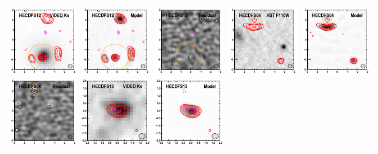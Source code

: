 \documentclass[iop]{emulateapj}
\begin{document}
\begin{figure}[!tbp] 
    \begin{centering}
\includegraphics[width=0.162\textwidth]{HECDFS12_optical_bestfit.pdf}
\includegraphics[width=0.162\textwidth]{HECDFS12_model_bestfit.pdf}
\includegraphics[width=0.162\textwidth]{HECDFS12_residual_bestfit.pdf}
\includegraphics[width=0.162\textwidth]{HECDFS04_optical_bestfit.pdf}
\includegraphics[width=0.162\textwidth]{HECDFS04_model_bestfit.pdf}
\includegraphics[width=0.162\textwidth]{HECDFS04_residual_bestfit.pdf}
\includegraphics[width=0.162\textwidth]{HECDFS13_optical_bestfit.pdf}
\includegraphics[width=0.162\textwidth]{HECDFS13_model_bestfit.pdf}

\end{centering}
\end{figure}
\end{document}
